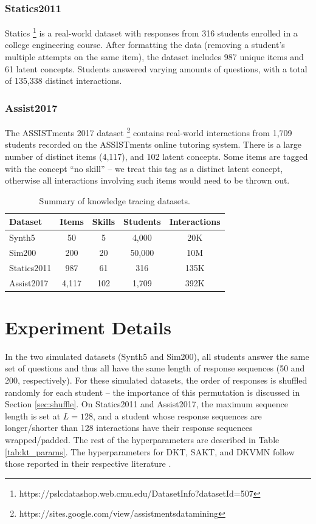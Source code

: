 \subsubsection*{Statics2011}
Statics \footnote{https://pslcdatashop.web.cmu.edu/DatasetInfo?datasetId=507} is a real-world dataset with responses from 316 students enrolled in a college engineering course. After formatting the data (removing a student's multiple attempts on the same item), the dataset includes 987 unique items and 61 latent concepts. Students answered varying amounts of questions, with a total of 135,338 distinct interactions.

\subsubsection*{Assist2017}
The ASSISTments 2017 dataset \footnote{https://sites.google.com/view/assistmentsdatamining} contains real-world interactions from 1,709 students recorded on the ASSISTments online tutoring system. There is a large number of distinct items (4,117), and 102 latent concepts. Some items are tagged with the concept ``no skill'' -- we treat this tag as a distinct latent concept, otherwise all interactions involving such items would need to be thrown out.

\begin{table}
  \centering
  \begin{tabular}{l c c c c}
    \hline
    Dataset & Items & Skills & Students & Interactions \\
    \hline
    Synth5 & 50 & 5 & 4,000 & 20K \\
    Sim200 & 200 & 20 & 50,000 & 10M \\
    Statics2011 & 987 & 61 & 316 & 135K \\
    Assist2017 & 4,117 & 102 & 1,709 & 392K \\
  \end{tabular}
  \caption{Summary of knowledge tracing datasets.}
  \label{tab:kt_data}
\end{table}


\section*{Experiment Details}
In the two simulated datasets (Synth5 and Sim200), all students answer the same set of questions and thus all have the same length of response sequences (50 and 200, respectively). For these simulated datasets, the order of responses is shuffled randomly for each student -- the importance of this permutation is discussed in Section \ref{sec:shuffle}. On Statics2011 and Assist2017, the maximum sequence length is set at $L=128$, and a student whose response sequences are longer/shorter than 128 interactions have their response sequences wrapped/padded. The rest of the hyperparameters are described in Table \ref{tab:kt_params}. The hyperparameters for DKT, SAKT, and DKVMN follow those reported in their respective literature \cite{pandey2019, piech2015, zhang2017}.

